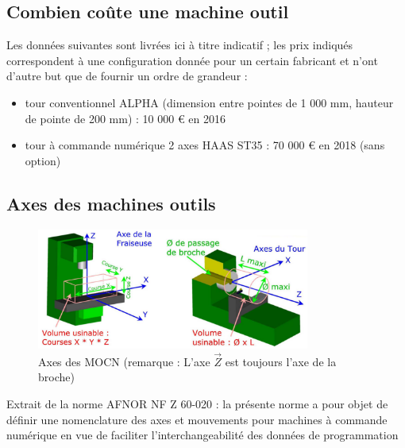 \documentclass[
	11pt, %
	fleqn, %
	a4paper, %
]{LegrandOrangeBook}
\begin{document}
\subsection{Combien coûte une machine outil}

Les données suivantes sont livrées ici à titre indicatif ; les prix indiqués correspondent à une configuration donnée pour un certain fabricant et n’ont d’autre but que de fournir un ordre de grandeur : \\
\begin{itemize}
    \item tour conventionnel ALPHA (dimension entre pointes de 1 000 mm, hauteur de pointe de 200 mm) : 10 000 € en 2016
    \item tour à commande numérique 2 axes HAAS ST35 : 70 000 € en 2018 (sans option)
\end{itemize}

\subsection{Axes des machines outils}

\begin{figure}[H] %
	\centering %

	\includegraphics[width=0.8\textwidth]{Images/AA11.PNG} %
	\caption{Axes des MOCN (remarque : L'axe $\Vec{Z}$ est toujours l'axe de la broche)}
	\label{fig:placeholder} %

\end{figure}


Extrait de la norme AFNOR NF Z 60-020 : la présente norme a pour objet de définir une nomenclature des axes et mouvements pour machines à commande numérique en vue de faciliter l’interchangeabilité des données de programmation
\end{document}
